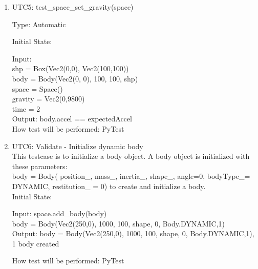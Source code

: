 \documentclass[12pt, titlepage]{article}
\begin{document}
\begin{enumerate}
%
%
%
%
%					
%
%
%
%
%
%
%
\item{UTC5}{: test\_space\_set\_gravity(space)\\}

Type: Automatic

Initial State: 

Input: \\
shp = Box(Vec2(0,0), Vec2(100,100))\\
body = Body(Vec2(0, 0), 100, 100, shp)\\
space = Space()\\
gravity = Vec2(0,9800)\\
time = 2\\

Output: body.accel == expectedAccel\\

How test will be performed: PyTest\\

\item{UTC6}{: Validate - Initialize dynamic body\\}
This testcase is to initialize a body object.
A body object is initialized with these parameters:\\ 
body = Body( position\_, mass\_, inertia\_, shape\_, angle=0, bodyType\_= DYNAMIC, restitution\_ = 0) to create and initialize a body.\\

Initial State: 

Input: space.add\_body(body)\\
body = Body(Vec2(250,0), 1000, 100, shape, 0, Body.DYNAMIC,1)\\

Output: body = Body(Vec2(250,0), 1000, 100, shape, 0, Body.DYNAMIC,1), 1 body created

How test will be performed: PyTest\\


\end{enumerate}
\end{document}

